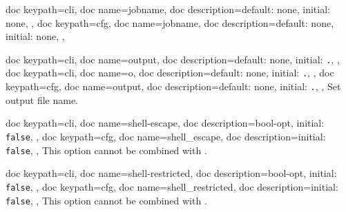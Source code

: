 \documentclass[a4paper, 11pt]{scrartcl}
\begin{document}
\begin{docKeys}[
		doc parameter={=\meta{jobname}},
	]{
		{
			doc keypath=cli,
			doc name=jobname,
			doc description={default: none, initial: none},
		},
		{
			doc keypath=cfg,
			doc name=jobname,
			doc description={default: none, initial: none},
		},
	}
\end{docKeys}
\begin{docKeys}[
		doc parameter={=\meta{output}},
	]{
		{
			doc keypath=cli,
			doc name=output,
			doc description={default: none, initial: \texttt{.}},
		},
		{
			doc keypath=cli,
			doc name=o,
			doc description={default: none, initial: \texttt{.}},
		},
		{
			doc keypath=cfg,
			doc name=output,
			doc description={default: none, initial: \texttt{.}},
		},
	}
	Set output file name.
\end{docKeys}
\begin{docKeys}[
	]{
		{
			doc keypath=cli,
			doc name=shell-escape,
			doc description={bool-opt, initial: \texttt{false}},
		},
		{
			doc keypath=cfg,
			doc name=shell_escape,
			doc description={initial: \texttt{false}},
		},
	}
	This option cannot be combined with .
\end{docKeys}
\begin{docKeys}[
	]{
		{
			doc keypath=cli,
			doc name=shell-restricted,
			doc description={bool-opt, initial: \texttt{false}},
		},
		{
			doc keypath=cfg,
			doc name=shell_restricted,
			doc description={initial: \texttt{false}},
		},
	}
	This option cannot be combined with .
\end{docKeys}
\end{document}
